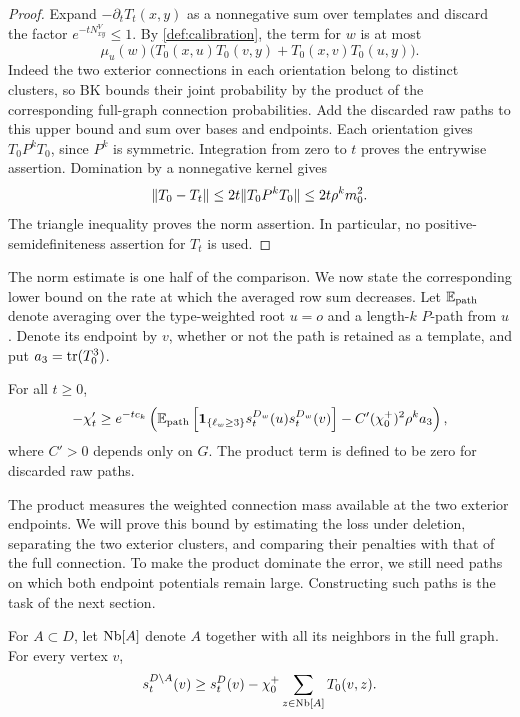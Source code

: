 \begin{proof}
Expand $-\partial_tT_t(x,y)$ as a nonnegative sum over templates and
discard the factor $e^{-tN^V_{xy}}\le1$.  By
\cref{def:calibration}, the term for $w$ is at most
\[
 \mu_u(w)\bigl(T_0(x,u)T_0(v,y)+T_0(x,v)T_0(u,y)\bigr).
\]
Indeed the two exterior connections in each orientation belong to distinct
clusters, so BK bounds their joint probability by the product of the
corresponding full-graph connection probabilities.  Add the discarded raw
paths to this upper bound and sum over bases and endpoints.  Each orientation
gives $T_0P^kT_0$, since $P^k$ is symmetric.  Integration from zero to $t$
proves the entrywise assertion.  Domination by a nonnegative kernel gives
\[
 \lVert T_0-T_t\rVert\le 2t\lVert T_0P^kT_0\rVert
                  \le2t\rho^km_0^2.
\]
The triangle inequality proves the norm assertion.  In particular, no
positive-semidefiniteness assertion for $T_t$ is used.
\end{proof}

The norm estimate is one half of the comparison. We now state the
corresponding lower bound on the rate at which the averaged row sum
decreases. Let $\mathbb E_{\rm path}$ denote averaging over the type-weighted
root $u=o$ and a length-$k$ $P$-path from $u$. Denote its endpoint by
$v$, whether or not the path is retained as a template, and put
$a_3=\operatorname{tr}(T_0^3)$.

\begin{proposition}\label{def:decrease}
For all $t\ge0$,
\begin{equation}\label{eq:s31}
 -\chi_t'\ge e^{-tc_k}
 \left(
 \mathbb E_{\rm path}\left[
       \mathbf 1_{\{\ell_w\ge3\}}s_t^{D_w}(u)s_t^{D_w}(v)\right]
       -C'(\chi_0^+)^2\rho^ka_3
 \right),
\end{equation}
where $C'>0$ depends only on $G$.
The product term is defined to be zero for discarded raw paths.
\end{proposition}

The product measures the weighted connection mass available at the
two exterior endpoints. We will prove this bound by estimating the
loss under deletion, separating the two exterior clusters, and
comparing their penalties with that of the full connection. To make the
product dominate the error, we still need paths on which both endpoint
potentials remain large. Constructing such paths is the task of the next
section.

\begin{lemma}\label{def:deletion}
For $A\subset D$, let $\operatorname{Nb}[A]$ denote $A$ together with all its neighbors
in the full graph.  For every vertex $v$,
\begin{equation}\label{eq:s28}
 s_t^{D\setminus A}(v)
 \ge s_t^D(v)-\chi_0^+\sum_{z\in\operatorname{Nb}[A]}T_0(v,z).
\end{equation}
\end{lemma}

